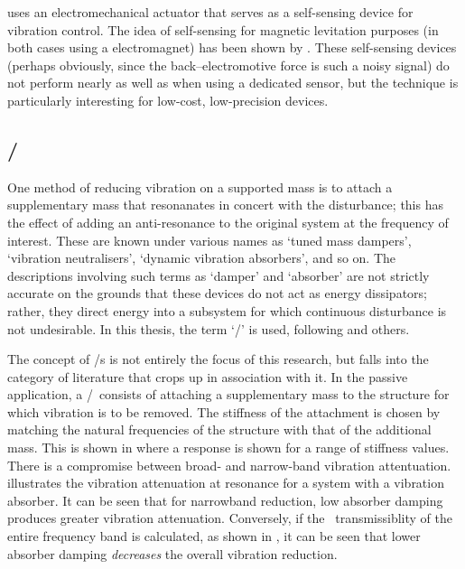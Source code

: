\textcite{paulitsch2003} uses an electromechanical actuator that serves as a
self-sensing device for vibration control. The idea of self-sensing for
magnetic levitation purposes (in both cases using a electromagnet) has been
shown by \textcite{bleuler1992,vischer1993}. These self-sensing devices
(perhaps obviously, since the back--electromotive force is such a noisy
signal) do not perform nearly as well as when using a dedicated sensor, but
the technique is particularly interesting for low-cost, low-precision devices.





\subsection{\Vibneut/}

One method of reducing vibration on a supported mass is to attach a
supplementary mass that resonanates in concert with the disturbance; this has
the effect of adding an anti-resonance to the original system at the frequency
of interest. These are known under various names as `tuned mass dampers',
`vibration neutralisers', `dynamic vibration absorbers', and so on.  The descriptions
involving such terms as `damper' and `absorber' are not strictly accurate on
the grounds that these devices do not act as energy dissipators; rather, they
direct energy into a subsystem for which continuous disturbance is not
undesirable. In this thesis, the term `\vibneut/' is used, following
\textcite{kidner1998} and others.

The concept of \vibneut/{}s is not entirely the focus of this research, but
falls into the category of literature that crops up in association with it. In
the passive application, a \vibneut/\ consists of attaching a supplementary
mass to the structure for which vibration is to be removed. The stiffness of
the attachment is chosen by matching the natural frequencies of the structure
with that of the additional mass. This is shown in 
where a response is shown for a range of stiffness values. There is a
compromise between broad- and narrow-band vibration attentuation.
 illustrates the vibration attenuation at
resonance for a system with a vibration absorber. It can be seen that for
narrowband reduction, low absorber damping produces greater vibration
attenuation. Conversely, if the \RMS\ transmissiblity of the entire frequency
band is calculated, as shown in , it can be seen that
lower absorber damping \emph{decreases} the overall vibration reduction.

